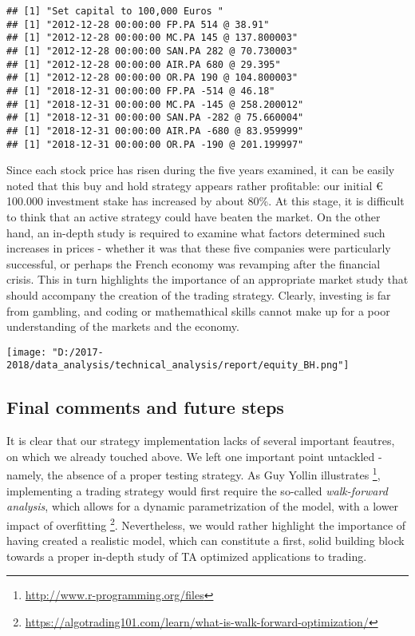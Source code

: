 \documentclass[
  11pt,
]{article}
\let\origfigure\figure
\let\endorigfigure\endfigure
\renewenvironment{figure}[1][2] {
    \expandafter\origfigure\expandafter[H]
} {
    \endorigfigure
}
\begin{document}
\begin{verbatim}
## [1] "Set capital to 100,000 Euros "
## [1] "2012-12-28 00:00:00 FP.PA 514 @ 38.91"
## [1] "2012-12-28 00:00:00 MC.PA 145 @ 137.800003"
## [1] "2012-12-28 00:00:00 SAN.PA 282 @ 70.730003"
## [1] "2012-12-28 00:00:00 AIR.PA 680 @ 29.395"
## [1] "2012-12-28 00:00:00 OR.PA 190 @ 104.800003"
## [1] "2018-12-31 00:00:00 FP.PA -514 @ 46.18"
## [1] "2018-12-31 00:00:00 MC.PA -145 @ 258.200012"
## [1] "2018-12-31 00:00:00 SAN.PA -282 @ 75.660004"
## [1] "2018-12-31 00:00:00 AIR.PA -680 @ 83.959999"
## [1] "2018-12-31 00:00:00 OR.PA -190 @ 201.199997"
\end{verbatim}

Since each stock price has risen during the five years examined, it can
be easily noted that this buy and hold strategy appears rather
profitable: our initial € 100.000 investment stake has increased by
about 80\%. At this stage, it is difficult to think that an active
strategy could have beaten the market. On the other hand, an in-depth
study is required to examine what factors determined such increases in
prices - whether it was that these five companies were particularly
successful, or perhaps the French economy was revamping after the
financial crisis. This in turn highlights the importance of an
appropriate market study that should accompany the creation of the
trading strategy. Clearly, investing is far from gambling, and coding or
mathemathical skills cannot make up for a poor understanding of the
markets and the economy.

\begin{figure}
\centering
\texttt{[image: "D:/2017-2018/data\_analysis/technical\_analysis/report/equity\_BH.png"]}
\caption{Account Capital level evolution of long positions in B\&H
strategy}
\end{figure}

\hypertarget{final-comments-and-future-steps}{%
\subsection{Final comments and future
steps}\label{final-comments-and-future-steps}}

It is clear that our strategy implementation lacks of several important
feautres, on which we already touched above. We left one important point
untackled - namely, the absence of a proper testing strategy. As Guy
Yollin illustrates \footnote{\url{http://www.r-programming.org/files}},
implementing a trading strategy would first require the so-called
\emph{walk-forward analysis}, which allows for a dynamic parametrization
of the model, with a lower impact of overfitting \footnote{\url{https://algotrading101.com/learn/what-is-walk-forward-optimization/}}.
Nevertheless, we would rather highlight the importance of having created
a realistic model, which can constitute a first, solid building block
towards a proper in-depth study of TA optimized applications to trading.
\end{document}
